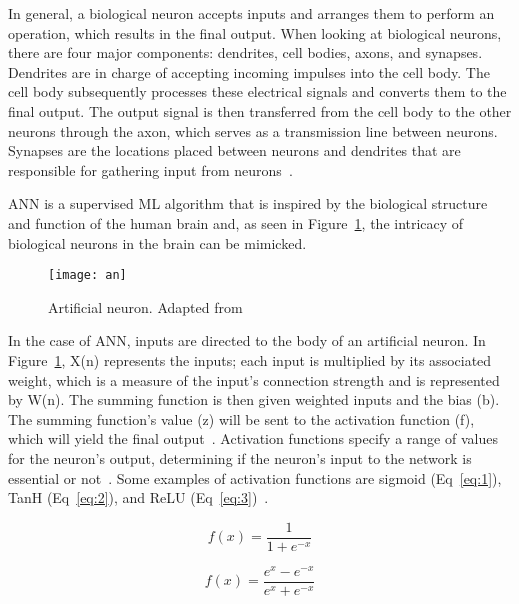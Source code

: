 In general, a biological neuron accepts inputs and arranges them to perform an operation, which results in the final output. When looking at biological neurons, there are four major components: dendrites, cell bodies, axons, and synapses. Dendrites are in charge of accepting incoming impulses into the cell body. The cell body subsequently processes these electrical signals and converts them to the final output. The output signal is then transferred from the cell body to the other neurons through the axon, which serves as a transmission line between neurons. Synapses are the locations placed between neurons and dendrites that are responsible for gathering input from neurons~\cite{Imran2019AClassification}. 

\gls{ANN} is a supervised \gls{ML} algorithm that is inspired by the biological structure and function of the human brain and, as seen in Figure~\ref{fig:an}, the intricacy of biological neurons in the brain can be mimicked.

\begin{figure}[htbp]
    \centering
    \texttt{[image: an]}
    \caption{Artificial neuron. Adapted from~\cite{Baheti12Choose}}
    \label{fig:an}
\end{figure}

In the case of \gls{ANN}, inputs are directed to the body of an artificial neuron. In Figure~\ref{fig:an}, X(n) represents the inputs; each input is multiplied by its associated weight, which is a measure of the input's connection strength and is represented by W(n). The summing function is then given weighted inputs and the bias (b). The summing function's value (z) will be sent to the activation function (f), which will yield the final output~\cite{Imran2019AClassification}. Activation functions specify a range of values for the neuron's output, determining if the neuron's input to the network is essential or not~\cite{2020ArtificialNetworks}. Some examples of activation functions are sigmoid (Eq~\ref{eq:1}), TanH (Eq~\ref{eq:2}), and ReLU (Eq~\ref{eq:3})~\cite{EnyinnaNwankpa2018ActivationLearning}.


\begin{equation}\label{eq:1}
    f(x) = \frac{1}{1+e^{-x}}
\end{equation}

\begin{equation}\label{eq:2}
    f(x) = \frac{e^{x}-e^{-x}}{e^{x}+e^{-x}}
\end{equation}

